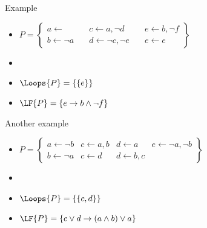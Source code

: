 \begin{frame}{Example}
  \bigskip
  \begin{itemize}
  \item<1->
    \(
    P
    =
    \left\{
      \begin{array}{lll}
        a \leftarrow                  \quad &
        c \leftarrow a, \neg d       \quad &
        e \leftarrow b, \neg f
        \\
        b \leftarrow \neg a         \quad &
        d \leftarrow \neg c, \neg e \quad &
        e \leftarrow e
      \end{array}
    \right\}
    \)
    \bigskip
  \item<1-> []
    \begin{center}
      
    \end{center}
  \item<1-> $\Loops{P}=\{\{e\}\}$
    \smallskip
  \item<2-> $\LF{P}=\{e\rightarrow b\wedge\neg f\}$
  \end{itemize}
\end{frame}
\begin{frame}{Another example}
  \bigskip
  \begin{itemize}
  \item<1->
    \(
    P
    =
    \left\{
      \begin{array}{llll}
        a \leftarrow \neg b
      & c \leftarrow a,b
      & d \leftarrow a
      & e \leftarrow\neg a,\neg b
      \\
        b \leftarrow \neg a
      & c \leftarrow d
      & d \leftarrow b,c
      &
      \end{array}
    \right\}
    \)
    \bigskip
  \item<1-> []
    \begin{center}
      
    \end{center}
    \smallskip
  \item<1-> $\Loops{P}=\{\{c,d\}\}$
    \smallskip
  \item<2-> $\LF{P}=\{c\vee d\rightarrow (a\wedge b)\vee a\}$
  \end{itemize}
\end{frame}
